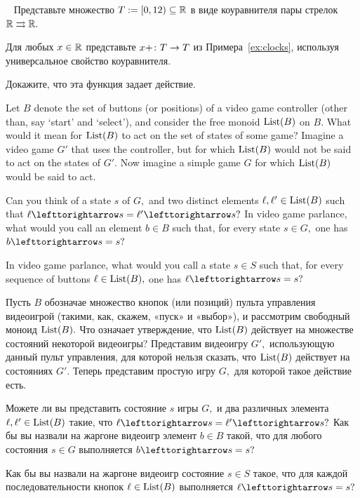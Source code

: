\documentclass[../main/CT4S-EN-RU]{subfiles}
\begin{document}
\begin{exerciseRUS}\label{exc:clock}~
\sexc Представьте множество $T:=[0,12)\subseteq{\mathbb R}$ в виде коуравнителя пары стрелок ${\mathbb R}\rightrightarrows{\mathbb R}.$
\item Для любых $x\in{\mathbb R}$ представьте $x+ \colon T\rightarrow T$ из Примера~\ref{ex:clocks}, используя универсальное свойство коуравнителя.
\item Докажите, что эта функция задает действие.
\endsexc
\end{exerciseRUS}

\begin{exerciseENG}
Let $B$ denote the set of buttons (or positions) of a video game controller (other than, say `start' and `select'), and consider the free monoid $\operatorname{List}(B)$ on $B.$
\sexc What would it mean for $\operatorname{List}(B)$ to act on the set of states of some game? Imagine a video game $G'$ that uses the controller, but for which $\operatorname{List}(B)$ would not be said to act on the states of $G'.$ Now imagine a simple game $G$ for which $\operatorname{List}(B)$ would be said to act.
\item Can you think of a state $s$ of $G,$ and two distinct elements $\ell,\ell'\in\operatorname{List}(B)$ such that $\ell\acts s=\ell'\acts s?$ In video game parlance, what would you call an element $b\in B$ such that, for every state $s\in G,$ one has $b\acts s=s?$
\item In video game parlance, what would you call a state $s\in S$ such that, for every sequence of buttons $\ell\in\operatorname{List}(B),$ one has $\ell\acts s=s?$
\endsexc
\end{exerciseENG}

\begin{exerciseRUS}
Пусть $B$ обозначае множество кнопок (или позиций) пульта управления видеоигрой (такими, как, скажем, «пуск» и «выбор»), и рассмотрим свободный моноид $\operatorname{List}(B).$
\sexc Что означает утверждение, что $\operatorname{List}(B)$ действует на множестве состояний некоторой видеоигры? Представим видеоигру $G',$ использующую данный пульт управления, для которой нельзя сказать, что  $\operatorname{List}(B)$ действует на состояниях $G'.$ Теперь представим простую игру $G,$ для которой такое действие есть.
\item Можете ли вы представить состояние $s$ игры $G,$ и два различных элемента $\ell,\ell'\in\operatorname{List}(B)$ такие, что $\ell\acts s=\ell'\acts s?$ Как бы вы назвали на жаргоне видеоигр элемент $b\in B$ такой, что для любого состояния $s\in G$ выполняется $b\acts s=s?$
\item Как бы вы назвали на жаргоне видеоигр состояние $s\in S$ такое, что для каждой последовательности кнопок $\ell\in\operatorname{List}(B)$ выполняется $\ell\acts s=s?$
\endsexc
\end{exerciseRUS}
\end{document}
